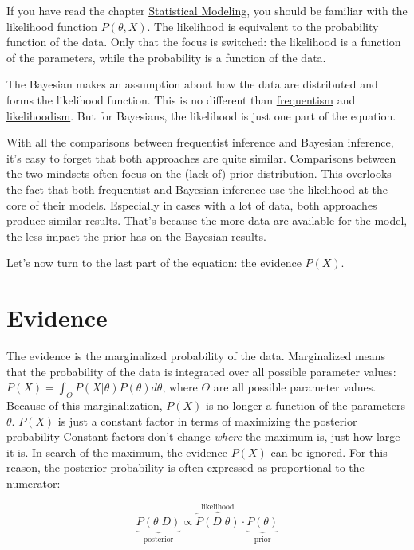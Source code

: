 \documentclass[
  10pt,
]{scrbook}
\begin{document}
If you have read the chapter \protect\hyperlink{statistical-modeling}{Statistical Modeling}, you should be familiar with the likelihood function \(P(\theta, X)\).
The likelihood is equivalent to the probability function of the data.
Only that the focus is switched: the likelihood is a function of the parameters, while the probability is a function of the data.

The Bayesian makes an assumption about how the data are distributed and forms the likelihood function.
This is no different than \protect\hyperlink{frequentism}{frequentism} and \protect\hyperlink{likelihoodism}{likelihoodism}.
But for Bayesians, the likelihood is just one part of the equation.

With all the comparisons between frequentist inference and Bayesian inference, it's easy to forget that both approaches are quite similar.
Comparisons between the two mindsets often focus on the (lack of) prior distribution.
This overlooks the fact that both frequentist and Bayesian inference use the likelihood at the core of their models.
Especially in cases with a lot of data, both approaches produce similar results.
That's because the more data are available for the model, the less impact the prior has on the Bayesian results.

Let's now turn to the last part of the equation: the evidence \(P(X)\).

\hypertarget{evidence}{%
\section{Evidence}\label{evidence}}

The evidence is the marginalized probability of the data.
Marginalized means that the probability of the data is integrated over all possible parameter values: \(P(X) = \int_{\Theta} P(X|\theta) P(\theta) d\theta\), where \(\Theta\) are all possible parameter values.
Because of this marginalization, \(P(X)\) is no longer a function of the parameters \(\theta\).
\(P(X)\) is just a constant factor in terms of maximizing the posterior probability
Constant factors don't change \emph{where} the maximum is, just how large it is.
In search of the maximum, the evidence \(P(X)\) can be ignored.
For this reason, the posterior probability is often expressed as proportional to the numerator:

\[\underbrace{P(\theta|D)}_{\text{posterior}} \propto \overbrace{P(D | \theta)}^{\text{likelihood}} \cdot  \underbrace{P(\theta)}_{\text{prior}}\]
\end{document}
